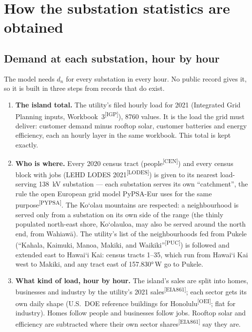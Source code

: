\documentclass[11pt,a4paper]{article}
\newcommand{\okina}{\textquoteleft}
\newcommand{\src}[1]{\textsuperscript{[#1]}}
\begin{document}
\section{How the substation statistics are obtained}
\label{sec:stats}

\subsection{Demand at each substation, hour by hour}

The model needs $d_n$ for every substation in every hour. No public record gives it,
so it is built in three steps from records that do exist.

\begin{enumerate}
  \item \textbf{The island total.} The utility's filed hourly load for 2021
        (Integrated Grid Planning inputs, Workbook~3\src{IGP}), \num{8760} values.
        It is the load the grid must deliver: customer demand minus rooftop solar,
        customer batteries and energy efficiency, each an hourly layer in the same
        workbook. This total is kept exactly.
  \item \textbf{Who is where.} Every 2020 census tract (people\src{CEN}) and every
        census block with jobs (LEHD LODES 2021\src{LODES}) is given to its nearest
        load-serving \SI{138}{kV} substation --- each substation serves its own
        ``catchment'', the rule the open European grid model PyPSA-Eur uses for the same
        purpose\src{PYPSA}. The Ko\okina olau mountains are respected: a neighbourhood is served only from
        a substation on its own side of the range (the thinly populated north-east
        shore, Ko\okina olauloa, may also be served around the north end, from
        Wahiaw\=a). The utility's
        list of the neighbourhoods fed from Pukele (``Kahala, Kaimuki, Manoa, Makiki,
        and Waikiki''\src{PUC}) is followed and extended east to Hawai\okina i Kai:
        census tracts 1--35, which run from Hawai\okina i Kai west to Makiki, and any
        tract east of \ang{157.830}\,W go to Pukele.
  \item \textbf{What kind of load, hour by hour.} The island's sales are split into
        homes, businesses and industry by the utility's 2021 sales\src{EIA861}; each
        sector gets its own daily shape (U.S.\ DOE reference buildings for
        Honolulu\src{OEI}; flat for industry). Homes follow people and businesses follow
        jobs. Rooftop solar and efficiency are subtracted where their own sector
        shares\src{EIA861} say they are.
\end{enumerate}
\end{document}
